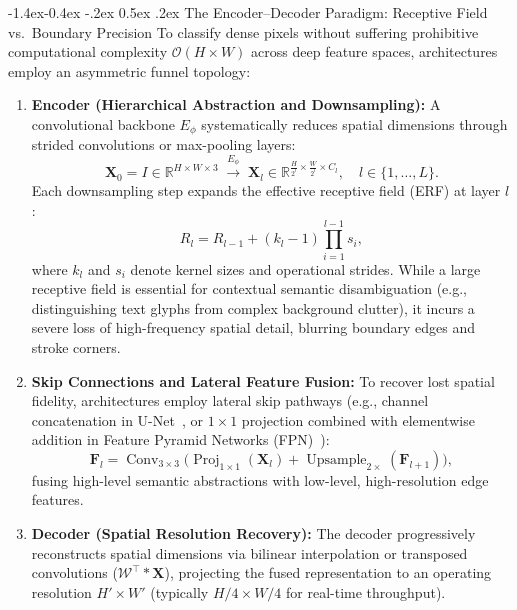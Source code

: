\documentclass[11pt,a4paper]{article}
\makeatletter
\renewcommand\subsection{\@startsection{subsection}{2}{\z@}%
                                     {-1.4ex\@plus -0.4ex \@minus -.2ex}%
                                     {0.5ex \@plus .2ex}%
                                     {\normalfont\normalsize\bfseries}}
\newcommand{\1}{\mathbf{1}}
\makeatother
\begin{document}
\subsection{The Encoder--Decoder Paradigm: Receptive Field vs.\ Boundary Precision}
To classify dense pixels without suffering prohibitive computational complexity $\mathcal{O}(H \times W)$ across deep feature spaces, architectures employ an asymmetric funnel topology:
\begin{enumerate}
    \item \textbf{Encoder (Hierarchical Abstraction and Downsampling):} A convolutional backbone $E_\phi$ systematically reduces spatial dimensions through strided convolutions or max-pooling layers:
    \[
    \mathbf{X}_0 = I \in \mathbb{R}^{H \times W \times 3} \;\xrightarrow{E_\phi}\; \mathbf{X}_l \in \mathbb{R}^{\frac{H}{2^l} \times \frac{W}{2^l} \times C_l}, \quad l \in \{1, \dots, L\}.
    \]
    Each downsampling step expands the effective receptive field (ERF) at layer $l$:
    \begin{equation}
    R_l = R_{l-1} + (k_l - 1) \prod_{i=1}^{l-1} s_i,
    \label{eq:erf}
    \end{equation}
    where $k_l$ and $s_i$ denote kernel sizes and operational strides. While a large receptive field is essential for contextual semantic disambiguation (e.g., distinguishing text glyphs from complex background clutter), it incurs a severe loss of high-frequency spatial detail, blurring boundary edges and stroke corners.
    \item \textbf{Skip Connections and Lateral Feature Fusion:} To recover lost spatial fidelity, architectures employ lateral skip pathways (e.g., channel concatenation in U-Net~\cite{unet}, or $1{\times}1$ projection combined with elementwise addition in Feature Pyramid Networks (FPN)~\cite{fpn}):
    \begin{equation}
    \mathbf{F}_l = \operatorname{Conv}_{3\times 3}\!\Big( \operatorname{Proj}_{1\times 1}(\mathbf{X}_l) + \operatorname{Upsample}_{2\times}(\mathbf{F}_{l+1}) \Big),
    \label{eq:fpn-fusion}
    \end{equation}
    fusing high-level semantic abstractions with low-level, high-resolution edge features.
    \item \textbf{Decoder (Spatial Resolution Recovery):} The decoder progressively reconstructs spatial dimensions via bilinear interpolation or transposed convolutions ($\mathcal{W}^\top * \mathbf{X}$), projecting the fused representation to an operating resolution $H' \times W'$ (typically $H/4 \times W/4$ for real-time throughput).
\end{enumerate}
\end{document}
